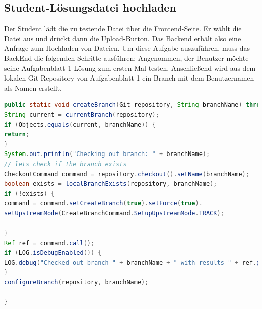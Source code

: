 \documentclass[a4paper,12pt,oneside]{book}
\begin{document}
\subsection{Student-Lösungsdatei hochladen}
Der Student lädt die zu testende Datei über die Frontend-Seite. Er wählt die Datei aus und drückt dann die Upload-Button. Das Backend erhält also eine Anfrage zum Hochladen von Dateien. Um diese Aufgabe auszuführen, muss das BackEnd die folgenden Schritte ausführen: Angenommen, der Benutzer möchte seine Aufgabenblatt-1-Lösung zum ersten Mal testen. Anschließend wird aus dem lokalen Git-Repository von Aufgabenblatt-1 ein Branch mit dem Benutzernamen als Namen erstellt.

\begin{lstlisting}[language=JAVA,caption= createBranch ]
public static void createBranch(Git repository, String branchName) throws IOException, GitAPIException {
String current = currentBranch(repository);
if (Objects.equals(current, branchName)) {
return;
}
System.out.println("Checking out branch: " + branchName);
// lets check if the branch exists
CheckoutCommand command = repository.checkout().setName(branchName);
boolean exists = localBranchExists(repository, branchName);
if (!exists) {
command = command.setCreateBranch(true).setForce(true).
setUpstreamMode(CreateBranchCommand.SetupUpstreamMode.TRACK);

}
Ref ref = command.call();
if (LOG.isDebugEnabled()) {
LOG.debug("Checked out branch " + branchName + " with results " + ref.getName());
}
configureBranch(repository, branchName);

}
\end{lstlisting} 
\end{document}
